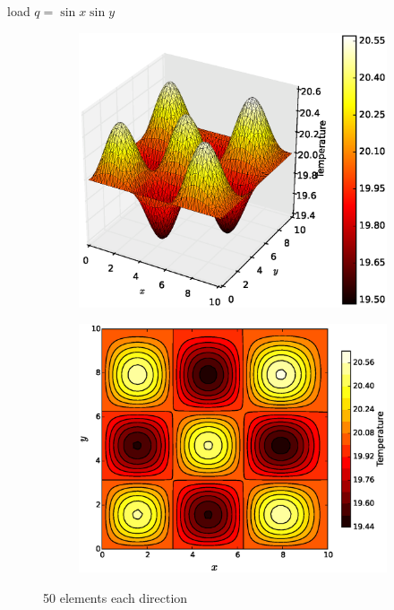 \documentclass[10pt, a4paper]{article}
\begin{document}
load $q=\sin x \sin y$

\begin{figure}[H]
\centering
	\begin{subfigure}[H]{0.5\textwidth}
		\includegraphics[width=1.2\textwidth]{fig/figure_4.eps}
		\caption{}
		\label{fig:1}
	\end{subfigure}
	\begin{subfigure}[H]{0.3\textwidth}
		\includegraphics[width=\textwidth]{fig/figure_4.1.eps}
		\caption{}
		\label{fig:2}
	\end{subfigure}
	\caption{50 elements each direction}
	\label{fig:3_1}
\end{figure}
\end{document}
